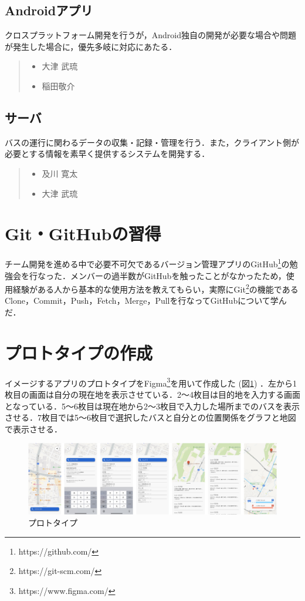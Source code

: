 \subsection{Androidアプリ}
クロスプラットフォーム開発を行うが，Android独自の開発が必要な場合や問題が発生した場合に，優先多岐に対応にあたる．
\begin{quote}
    \begin{itemize}
        \item 大津 武琉
        \item 稲田敬介
    \end{itemize}
\end{quote}

\subsection{サーバ}
バスの運行に関わるデータの収集・記録・管理を行う．また，クライアント側が必要とする情報を素早く提供するシステムを開発する．
\begin{quote}
    \begin{itemize}
        \item 及川 寛太
        \item 大津 武琉
    \end{itemize}
\end{quote}

\section{Git・GitHubの習得}
チーム開発を進める中で必要不可欠であるバージョン管理アプリのGitHub\footnote{https://github.com/}の勉強会を行なった．メンバーの過半数がGitHubを触ったことがなかったため，使用経験がある人から基本的な使用方法を教えてもらい，実際にGit\footnote{https://git-scm.com/}の機能であるClone，Commit，Push，Fetch，Merge，Pullを行なってGitHubについて学んだ．

\section{プロトタイプの作成}
イメージするアプリのプロトタイプをFigma\footnote{https://www.figma.com/}を用いて作成した (図\ref{fig:prototype_v2}) ．左から1枚目の画面は自分の現在地を表示させている．2〜4枚目は目的地を入力する画面となっている．5〜6枚目は現在地から2〜3枚目で入力した場所までのバスを表示させる．7枚目では5〜6枚目で選択したバスと自分との位置関係をグラフと地図で表示させる．

\begin{figure}[htbp]
    \centering
    \includegraphics[width=12cm]{images/prototype_v2.png}
    \caption{プロトタイプ}
    \label{fig:prototype_v2}
\end{figure}

